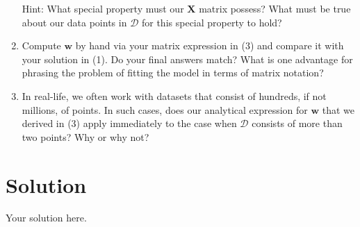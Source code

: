 \documentclass{../harvardml}
\theoremstyle{definition}
\theoremstyle{plain}
\newenvironment{solution}
  {\color{blue}\section*{Solution}}
{}
\begin{document}
\begin{problem}
\begin{enumerate}
    Hint: What special property must our $\mathbf{X}$ matrix possess? What must be true about our data points in $\mathcal{D}$ for this special property to hold?
    \item Compute $\mathbf{w}$ by hand via your matrix expression in (3) and compare it with your solution in (1). Do your final answers match? What is one advantage for phrasing the problem of fitting the model in terms of matrix notation? 
    \item In real-life, we often work with datasets that consist of hundreds, if not millions, of points. In such cases, does our analytical expression for $\mathbf{w}$ that we derived in (3) apply immediately to the case when $\mathcal{D}$ consists of more than two points? Why or why not?

\end{enumerate}
    
\end{problem}

\newpage


\begin{solution}
	Your solution here.
\end{solution}

\color{black}
\newpage
\end{document}
